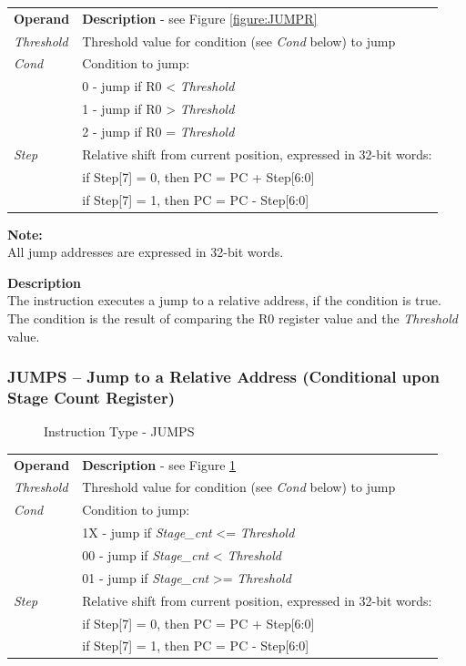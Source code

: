 \documentclass[main\_\_EN.tex]{subfiles}
\begin{document}
\begin{tabular}{ l l }
\textbf{Operand} & \textbf{Description} - see Figure \ref{figure:JUMPR} \\
\textit{Threshold} & Threshold value for condition (see \textit{Cond} below) to jump\\
\textit{Cond} & Condition to jump: \\
 & 0 - jump if R0 < \textit{Threshold} \\
 & 1 - jump if R0 > \textit{Threshold} \\
 & 2 - jump if R0 = \textit{Threshold} \\
\textit{Step} & Relative shift from current position, expressed in 32-bit words:\\
 & if Step[7] = 0, then PC = PC + Step[6:0] \\
 & if Step[7] = 1, then PC = PC - Step[6:0] \\

\end{tabular}

\textbf{Note:} \\
All jump addresses are expressed in 32-bit words.

\textbf{Description} \\
The instruction executes a jump to a relative address, if the condition is true. The condition is the result of comparing the R0 register value and the \textit{Threshold} value.


\subsubsection{JUMPS – Jump to a Relative Address (Conditional upon Stage Count Register)}\label{jumpstorelativeaddress}

%
%
%
%
%
\begin{figure}[!ht ]
    \centering
    \caption{Instruction Type - JUMPS}
    \label{figure:JUMPS}
\end{figure}

\begin{tabular}{ l l }
\textbf{Operand} & \textbf{Description} - see Figure \ref{figure:JUMPS} \\
\textit{Threshold} & Threshold value for condition (see \textit{Cond} below) to jump\\
\textit{Cond} & Condition to jump: \\
 & 1X - jump if \textit{Stage\_cnt} <= \textit{Threshold} \\
 & 00 - jump if \textit{Stage\_cnt} < \textit{Threshold} \\
 & 01 - jump if \textit{Stage\_cnt} >= \textit{Threshold} \\
\textit{Step} & Relative shift from current position, expressed in 32-bit words: \\
 & if Step[7] = 0, then PC = PC + Step[6:0] \\
 & if Step[7] = 1, then PC = PC - Step[6:0] \\

\end{tabular}
\end{document}
